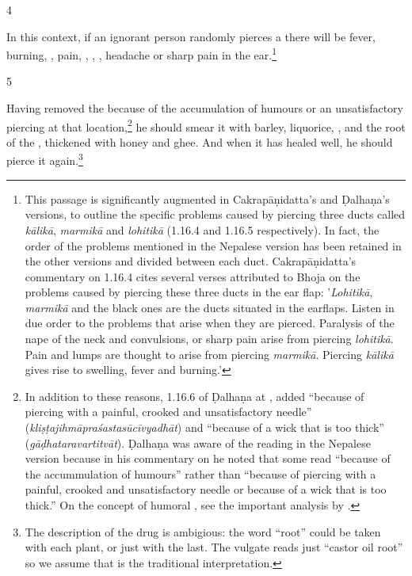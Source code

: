 \begin{translation}
\item [4] 
 
In this context, if an ignorant person randomly pierces a 
there will be fever, burning, , pain, ,
, ,
headache or sharp pain in the ear.\footnote{This passage is significantly
    augmented in Cakrapāṇidatta's and Ḍalhaṇa's versions, to outline the specific
    problems caused by piercing three ducts called \emph{kālikā}, \emph{marmikā} and
    \emph{lohitikā} (1.16.4 \citep[126]{acar-1939} and 1.16.5 \citep[77]{vulgate}
    respectively). In fact, the order of the problems mentioned in the Nepalese
    version has been retained in the other versions and divided between each duct.
    Cakrapāṇidatta's commentary on 1.16.4 \citep[126]{acar-1939} cites several verses
    attributed to Bhoja on the problems caused by piercing these three ducts in the
    ear flap: '\emph{Lohitikā}, \emph{marmikā} and the black ones are the ducts
    situated in the earflaps.  Listen in due order to the problems that arise when
    they are pierced. Paralysis of the nape of the neck and convulsions, or sharp pain
    arise from piercing \emph{lohitikā}. Pain and lumps are thought to arise from
    piercing \emph{marmikā}. Piercing \emph{kālikā} gives rise to swelling, fever and
    burning.'}
    
\item[5]     
    
Having removed the  because of the accumulation of
humours or an unsatisfactory piercing at that location,\footnote{In addition to these reasons,
    1.16.6 of Ḍalhaṇa at , added “because of piercing with a painful,
    crooked and unsatisfactory needle” (\emph{kliṣṭajihmāpraśastasūcīvyadhāt}) and 
    “because of a wick that is too thick” (\emph{gāḍhataravartitvāt}). Ḍalhaṇa was
    aware of the reading in the Nepalese version because in his commentary on
     he noted that some read “because of the accummulation of humours”
    rather than “because of piercing with a painful, crooked and unsatisfactory needle
    or because of a wick that is too thick.” On the concept of humoral
    , see the important analysis by \citet{meul-1992}.} he
    should smear it with barley, liquorice, ,
    and the root of the , thickened with honey and
    ghee. And when it has healed well, he should pierce it again.\footnote{The
        description of the drug is ambigious: the word “root” could be taken with each
        plant, or just with the last.  The vulgate reads just “castor oil root” so we
        assume that is the traditional interpretation.}
    

\end{translation}
